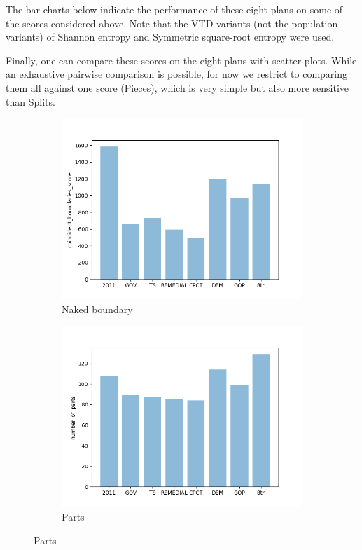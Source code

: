 \documentclass{mgggarticle}
\begin{document}
The bar charts below indicate the performance of these eight plans on some of the scores considered above. Note that the VTD variants (not the population variants) of Shannon entropy and Symmetric square-root entropy were used.

Finally, one can compare these scores on the eight plans with scatter plots. While an exhaustive pairwise comparison is possible, for now we restrict to comparing them all against one score (Pieces), which is very simple but also more sensitive than Splits.

\begin{figure}
\centering
\begin{subfigure}{0.4\textwidth}
\centering
\includegraphics[width=\textwidth]{figs/bars/coincident_boundaries_score_bar.png}
\caption{Naked boundary}
\end{subfigure}
\begin{subfigure}{0.4\textwidth}
\centering
\includegraphics[width=\textwidth]{figs/bars/number_of_parts_bar.png}
\caption{Parts}
\end{subfigure}


\end{figure}
\end{document}
